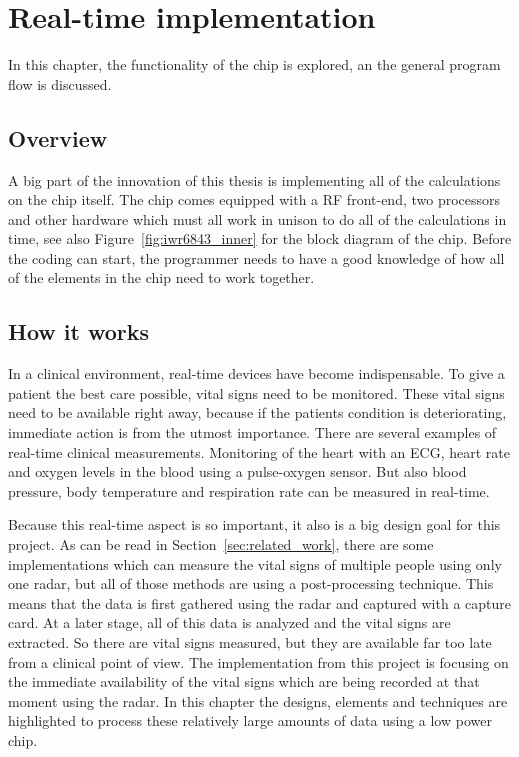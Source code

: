 \chapter{Real-time implementation}
\label{chp:realtime_implementation}

In this chapter, the functionality of the chip is explored, an the general program flow is discussed.

\section{Overview}
A big part of the innovation of this thesis is implementing all of the calculations on the chip itself. The chip comes equipped with a RF front-end, two processors and other hardware which must all work in unison to do all of the calculations in time, see also Figure~\ref{fig:iwr6843_inner} for the block diagram of the chip. Before the coding can start, the programmer needs to have a good knowledge of how all of the elements in the chip need to work together.

\section{How it works}
In a clinical environment, real-time devices have become indispensable. To give a patient the best care possible, vital signs need to be monitored. These vital signs need to be available right away, because if the patients condition is deteriorating, immediate action is from the utmost importance. There are several examples of real-time clinical measurements. Monitoring of the heart with an ECG, heart rate and oxygen levels in the blood using a pulse-oxygen sensor. But also blood pressure, body temperature and respiration rate can be measured in real-time.

Because this real-time aspect is so important, it also is a big design goal for this project. As can be read in Section~\ref{sec:related_work}, there are some implementations which can measure the vital signs of multiple people using only one radar, but all of those methods are using a post-processing technique. This means that the data is first gathered using the radar and captured with a capture card. At a later stage, all of this data is analyzed and the vital signs are extracted. So there are vital signs measured, but they are available far too late from a clinical point of view. The implementation from this project is focusing on the immediate availability of the vital signs which are being recorded at that moment using the radar. In this chapter the designs, elements and techniques are highlighted to process these relatively large amounts of data using a low power chip.


